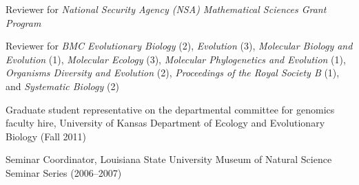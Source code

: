 \myHangIndent
Reviewer for
    \emph{National Security Agency (NSA) Mathematical Sciences Grant Program}

\myHangIndent
Reviewer for
    \emph{BMC Evolutionary Biology} (2),
    \emph{Evolution} (3),
    \emph{Molecular Biology and Evolution} (1),
    \emph{Molecular Ecology} (3),
    \emph{Molecular Phylogenetics and Evolution} (1),
    \emph{Organisms Diversity and Evolution} (2),
    \emph{Proceedings of the Royal Society B} (1),
    and
    \emph{Systematic Biology} (2)

\myHangIndent
Graduate student representative on the departmental committee for
    genomics faculty hire, University of Kansas Department of Ecology and
    Evolutionary Biology (Fall 2011)

\myHangIndent
Seminar Coordinator, Louisiana State University Museum of Natural Science
    Seminar Series (2006--2007)

